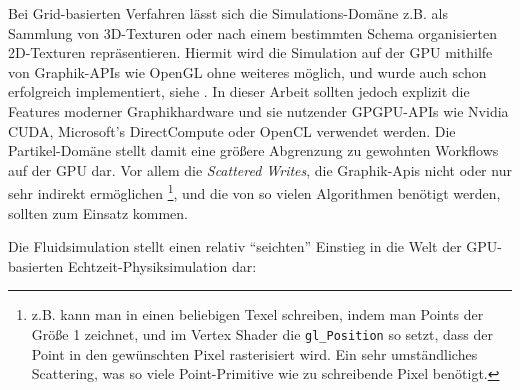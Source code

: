 Bei Grid-basierten Verfahren lässt sich die Simulations-Domäne z.B. als Sammlung von 3D-Texturen oder nach einem bestimmten Schema organisierten 2D-Texturen repräsentieren. Hiermit wird die Simulation auf der GPU mithilfe von Graphik-APIs wie OpenGL ohne weiteres möglich, und wurde auch schon erfolgreich implementiert, siehe \cite{Peschel2009}. 
In dieser Arbeit sollten jedoch explizit die Features moderner Graphikhardware und sie nutzender GPGPU-APIs wie Nvidia CUDA, Microsoft's DirectCompute oder OpenCL verwendet werden. Die Partikel-Domäne stellt damit eine größere Abgrenzung zu gewohnten Workflows auf der GPU dar. Vor allem die \emph{Scattered Writes}, die Graphik-Apis nicht oder nur sehr indirekt ermöglichen \footnote{z.B. kann man in einen beliebigen Texel schreiben, indem man Points der Größe 1 zeichnet, und
im Vertex Shader die \lstinline|gl_Position| so setzt, dass der Point in den gewünschten Pixel rasterisiert wird. Ein sehr umständliches Scattering, was so viele Point-Primitive wie zu schreibende Pixel benötigt.},  
und die von so vielen Algorithmen benötigt werden, sollten zum Einsatz kommen.

Die Fluidsimulation stellt einen relativ "`seichten"' Einstieg in die Welt der GPU-basierten Echtzeit-Physiksimulation dar:

